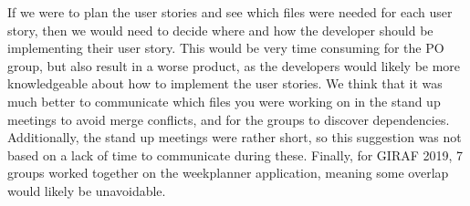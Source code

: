 If we were to plan the user stories and see which files were needed for each user story, then we would need to decide where and how the developer should be implementing their user story. 
This would be very time consuming for the PO group, but also result in a worse product, as the developers would likely be more knowledgeable about how to implement the user stories.
We think that it was much better to communicate which files you were working on in the stand up meetings to avoid merge conflicts, and for the groups to discover dependencies.
Additionally, the stand up meetings were rather short, so this suggestion was not based on a lack of time to communicate during these.
Finally, for GIRAF 2019, 7 groups worked together on the weekplanner application, meaning some overlap would likely be unavoidable.

